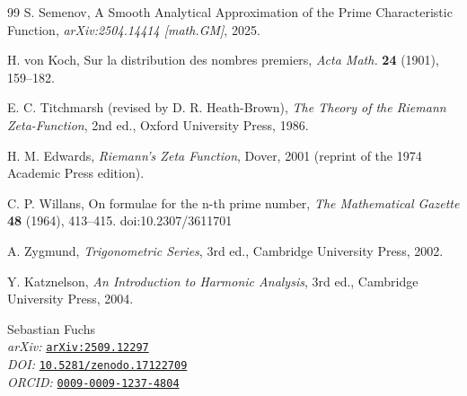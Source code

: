 \begin{thebibliography}{99}
S. Semenov, A Smooth Analytical Approximation of the Prime Characteristic Function, \emph{arXiv:2504.14414 [math.GM]}, 2025.

H. von Koch, Sur la distribution des nombres premiers, \emph{Acta Math.} \textbf{24} (1901), 159--182.

E. C. Titchmarsh (revised by D. R. Heath-Brown), \emph{The Theory of the Riemann Zeta-Function}, 2nd ed., Oxford University Press, 1986.

H. M. Edwards, \emph{Riemann's Zeta Function}, Dover, 2001 (reprint of the 1974 Academic Press edition).

C. P. Willans, On formulae for the n-th prime number,
\emph{The Mathematical Gazette} \textbf{48} (1964), 413--415.
doi:10.2307/3611701

A. Zygmund, \emph{Trigonometric Series}, 3rd ed., Cambridge University Press, 2002.

Y. Katznelson, \emph{An Introduction to Harmonic Analysis}, 3rd ed., Cambridge University Press, 2004.


\end{thebibliography}

\vfill
\par\noindent
\small
Sebastian Fuchs \\[1ex]
\textit{arXiv:} \texttt{\href{https://arxiv.org/abs/2509.12297}{arXiv:2509.12297}} \\
\textit{DOI:} \texttt{\href{https://doi.org/10.5281/zenodo.17122709}{10.5281/zenodo.17122709}} \\ 
\textit{ORCID:} \texttt{\href{https://orcid.org/0009-0009-1237-4804}{0009-0009-1237-4804}} \\

